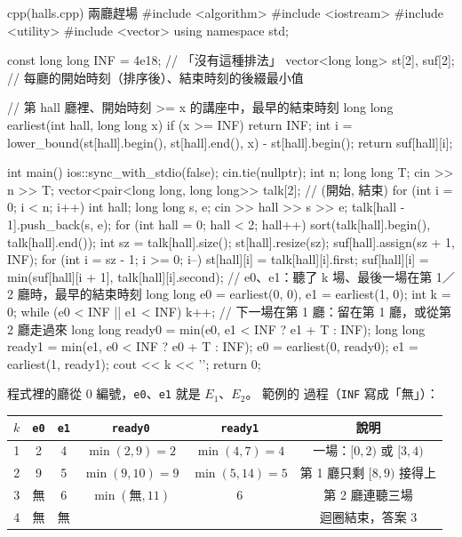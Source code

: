 \begin{example}[label=ex:cap-halls]{cpp}{(halls.cpp) 兩廳趕場}
#include <algorithm>
#include <iostream>
#include <utility>
#include <vector>
using namespace std;

const long long INF = 4e18;        // 「沒有這種排法」
vector<long long> st[2], suf[2];   // 每廳的開始時刻（排序後）、結束時刻的後綴最小值

// 第 hall 廳裡、開始時刻 >= x 的講座中，最早的結束時刻
long long earliest(int hall, long long x) {
    if (x >= INF) {
        return INF;
    }
    int i = lower_bound(st[hall].begin(), st[hall].end(), x) - st[hall].begin();
    return suf[hall][i];
}

int main() {
    ios::sync_with_stdio(false);
    cin.tie(nullptr);
    int n;
    long long T;
    cin >> n >> T;
    vector<pair<long long, long long>> talk[2];   // (開始, 結束)
    for (int i = 0; i < n; i++) {
        int hall;
        long long s, e;
        cin >> hall >> s >> e;
        talk[hall - 1].push_back({s, e});
    }
    for (int hall = 0; hall < 2; hall++) {
        sort(talk[hall].begin(), talk[hall].end());
        int sz = talk[hall].size();
        st[hall].resize(sz);
        suf[hall].assign(sz + 1, INF);
        for (int i = sz - 1; i >= 0; i--) {
            st[hall][i] = talk[hall][i].first;
            suf[hall][i] = min(suf[hall][i + 1], talk[hall][i].second);
        }
    }
    // e0、e1：聽了 k 場、最後一場在第 1／2 廳時，最早的結束時刻
    long long e0 = earliest(0, 0), e1 = earliest(1, 0);
    int k = 0;
    while (e0 < INF || e1 < INF) {
        k++;
        // 下一場在第 1 廳：留在第 1 廳，或從第 2 廳走過來
        long long ready0 = min(e0, e1 < INF ? e1 + T : INF);
        long long ready1 = min(e1, e0 < INF ? e0 + T : INF);
        e0 = earliest(0, ready0);
        e1 = earliest(1, ready1);
    }
    cout << k << '\n';
    return 0;
}
\end{example}


程式裡的廳從 $0$ 編號，\texttt{e0}、\texttt{e1} 就是 $E_1$、$E_2$。 範例的
過程（\texttt{INF} 寫成「無」）：

\begin{center}
\begin{tabular}{cccccc}
\toprule
$k$ & \texttt{e0} & \texttt{e1} & \texttt{ready0} & \texttt{ready1} & 說明 \\
\midrule
1 & 2 & 4 & $\min(2, 9) = 2$ & $\min(4, 7) = 4$ & 一場：$[0, 2)$ 或 $[3, 4)$ \\
2 & 9 & 5 & $\min(9, 10) = 9$ & $\min(5, 14) = 5$ & 第 1 廳只剩 $[8, 9)$ 接得上 \\
3 & 無 & 6 & $\min(\text{無}, 11)$ & $6$ & 第 2 廳連聽三場 \\
4 & 無 & 無 & & & 迴圈結束，答案 $3$ \\
\bottomrule
\end{tabular}
\end{center}

